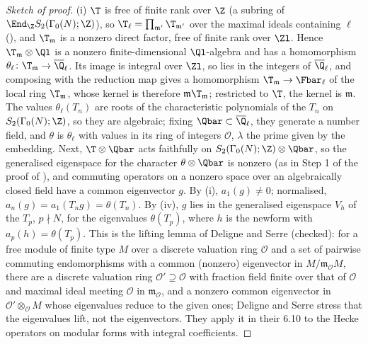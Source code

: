 \begin{proof}[Sketch of proof]
(i) $\T$ is free of finite rank over $\Z$ (a subring of $\End_\Z S_2(\Gamma_0(N);\Z)$), so $\T_\ell=\prod_{\mathfrak m'}\T_{\mathfrak m'}$ over the maximal ideals containing $\ell$
(), and $\T_{\mathfrak m}$ is a nonzero direct factor, free of finite rank over $\Zl$. Hence $\T_{\mathfrak m}\otimes\Ql$ is a nonzero finite-dimensional $\Ql$-algebra and has
a homomorphism $\theta_\ell\colon\T_{\mathfrak m}\to\overline\Q_\ell$. Its image is integral over $\Zl$, so lies in the integers of $\overline\Q_\ell$, and composing with the reduction map gives a
homomorphism $\T_{\mathfrak m}\to\Fbar_\ell$ of the local ring $\T_{\mathfrak m}$, whose kernel is therefore $\mathfrak m\T_{\mathfrak m}$; restricted to $\T$, the kernel is $\mathfrak m$. The values $\theta_\ell(T_n)$ are
roots of the characteristic polynomials of the $T_n$ on $S_2(\Gamma_0(N);\Z)$, so they are algebraic; fixing $\Qbar\subset\overline\Q_\ell$, they generate a number field, and $\theta$ is
$\theta_\ell$ with values in its ring of integers $\mathcal{O}$, $\lambda$ the prime given by the embedding. Next, $\T\otimes\Qbar$ acts faithfully on $S_2(\Gamma_0(N);\Z)\otimes\Qbar$, so the
generalised eigenspace for the character $\theta\otimes\Qbar$ is nonzero (as in Step 1 of the proof of ), and commuting operators on a nonzero space
over an algebraically closed field have a common eigenvector $g$. By (i), $a_1(g)\ne0$; normalised, $a_n(g)=a_1(T_ng)=\theta(T_n)$. By
(iv), $g$ lies in the generalised eigenspace $V_h$ of the $T_p$, $p\nmid N$, for the eigenvalues $\theta(T_p)$, where $h$ is the newform with
$a_p(h)=\theta(T_p)$. This is the lifting lemma of Deligne and Serre \cite[Lemme 6.11]{DeligneSerre74} (checked): for a free module of finite type $M$ over a discrete valuation ring $\mathcal O$
and a set of pairwise commuting endomorphisms with a common (nonzero) eigenvector in $M/\mathfrak m_{\mathcal O}M$, there are a discrete valuation ring $\mathcal O'\supseteq\mathcal O$ with fraction field
finite over that of $\mathcal O$ and maximal ideal meeting $\mathcal O$ in $\mathfrak m_{\mathcal O}$, and a nonzero common eigenvector in $\mathcal O'\otimes_{\mathcal O}M$ whose eigenvalues reduce to the given
ones; Deligne and Serre stress that the eigenvalues lift, not the eigenvectors. They apply it in their 6.10 to the Hecke operators on modular forms with integral coefficients.


\end{proof}

